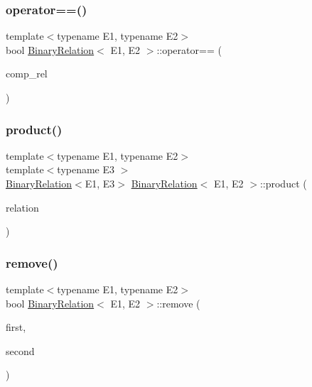 \mbox{\label{classBinaryRelation_a8921eea825f118f12079ff73866a95b8}} 
\subsubsection{\texorpdfstring{operator==()}{operator==()}}
{\footnotesize\ttfamily template$<$typename E1, typename E2$>$ \\
bool \hyperlink{classBinaryRelation}{Binary\+Relation}$<$ E1, E2 $>$\+::operator== (\begin{DoxyParamCaption}\item[{const \hyperlink{classBinaryRelation}{Binary\+Relation}$<$ E1, E2 $>$ \&}]{comp\+\_\+rel }\end{DoxyParamCaption})\hspace{0.3cm}{\ttfamily [inline]}}

\mbox{\label{classBinaryRelation_a5bb10d4cea0215ed647beec54f862414}} 
\subsubsection{\texorpdfstring{product()}{product()}}
{\footnotesize\ttfamily template$<$typename E1, typename E2$>$ \\
template$<$typename E3 $>$ \\
\hyperlink{classBinaryRelation}{Binary\+Relation}$<$E1, E3$>$ \hyperlink{classBinaryRelation}{Binary\+Relation}$<$ E1, E2 $>$\+::product (\begin{DoxyParamCaption}\item[{\hyperlink{classBinaryRelation}{Binary\+Relation}$<$ E2, E3 $>$}]{relation }\end{DoxyParamCaption})\hspace{0.3cm}{\ttfamily [inline]}}

\mbox{\label{classBinaryRelation_a8ae41ea2181d7cc5d1707c4584e8ebe0}} 
\subsubsection{\texorpdfstring{remove()}{remove()}}
{\footnotesize\ttfamily template$<$typename E1, typename E2$>$ \\
bool \hyperlink{classBinaryRelation}{Binary\+Relation}$<$ E1, E2 $>$\+::remove (\begin{DoxyParamCaption}\item[{E1}]{first,  }\item[{E2}]{second }\end{DoxyParamCaption})\hspace{0.3cm}{\ttfamily [inline]}}

